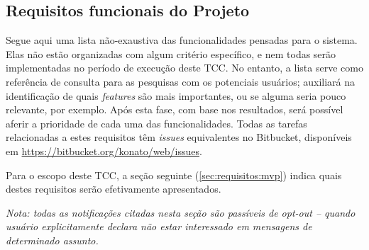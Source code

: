 \documentclass[12pt,a4paper,twoside,hyphens,english,brazil]{abntex2}
\begin{document}
\subsection{Requisitos funcionais do Projeto}

Segue aqui uma lista não-exaustiva das funcionalidades pensadas para o sistema. Elas não estão organizadas com algum critério específico, e nem todas serão implementadas no período de execução deste TCC. No entanto, a lista serve como referência de consulta para as pesquisas com os potenciais usuários; auxiliará na identificação de quais \emph{features} são mais importantes, ou se alguma seria pouco relevante, por exemplo. Após esta fase, com base nos resultados, será possível aferir a prioridade de cada uma das funcionalidades. Todas as tarefas relacionadas a estes requisitos têm \emph{issues} equivalentes no Bitbucket, disponíveis em \url{https://bitbucket.org/konato/web/issues}.

Para o escopo deste TCC, a seção seguinte (\ref{sec:requisitos:mvp}) indica quais destes requisitos serão efetivamente apresentados.

\textit{Nota: todas as notificações citadas nesta seção são passíveis de opt-out -- quando usuário explicitamente declara não estar interessado em mensagens de determinado assunto.}
\end{document}
